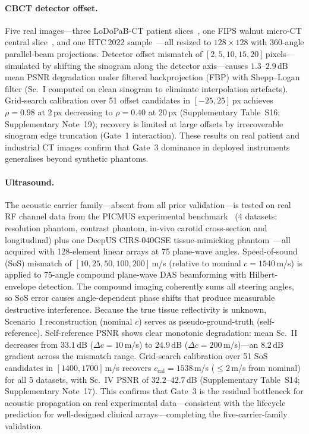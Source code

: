 \documentclass[11pt]{article}
\newcommand{\recoveryratio}{\rho}
\begin{document}
\paragraph{CBCT detector offset.}
Five real images---three LoDoPaB-CT patient slices~\cite{leuschner2021lodopab}, one FIPS walnut micro-CT central slice~\cite{hamalainen2015fips}, and one HTC\,2022 sample~\cite{meaney2022htc}---all resized to $128 \times 128$ with 360-angle parallel-beam projections. Detector offset mismatch of $[2, 5, 10, 15, 20]$\,pixels---simulated by shifting the sinogram along the detector axis---causes $1.3$--$2.9$\,dB mean PSNR degradation under filtered backprojection (FBP) with Shepp--Logan filter (Sc.~I computed on clean sinogram to eliminate interpolation artefacts). Grid-search calibration over 51 offset candidates in $[-25, 25]$\,px achieves $\recoveryratio = 0.98$ at $2$\,px decreasing to $\recoveryratio = 0.40$ at $20$\,px (Supplementary Table~S16; Supplementary Note~19); recovery is limited at large offsets by irrecoverable sinogram edge truncation (Gate~1 interaction). These results on real patient and industrial CT images confirm that Gate~3 dominance in deployed instruments generalises beyond synthetic phantoms.

\paragraph{Ultrasound.}
The acoustic carrier family---absent from all prior validation---is tested on real RF channel data from the PICMUS experimental benchmark~\cite{liebgott2016picmus} (4 datasets: resolution phantom, contrast phantom, in-vivo carotid cross-section and longitudinal) plus one DeepUS CIRS-040GSE tissue-mimicking phantom~\cite{khan2020deepus}---all acquired with 128-element linear arrays at 75 plane-wave angles. Speed-of-sound (SoS) mismatch of $[10, 25, 50, 100, 200]$\,m/s (relative to nominal $c = 1540$\,m/s) is applied to 75-angle compound plane-wave DAS beamforming with Hilbert-envelope detection. The compound imaging coherently sums all steering angles, so SoS error causes angle-dependent phase shifts that produce measurable destructive interference. Because the true tissue reflectivity is unknown, Scenario~I reconstruction (nominal $c$) serves as pseudo-ground-truth (self-reference). Self-reference PSNR shows clear monotonic degradation: mean Sc.~II decreases from $33.1$\,dB ($\Delta c{=}10$\,m/s) to $24.9$\,dB ($\Delta c{=}200$\,m/s)---an $8.2$\,dB gradient across the mismatch range. Grid-search calibration over 51 SoS candidates in $[1400, 1700]$\,m/s recovers $c_{\mathrm{cal}} = 1538$\,m/s ($\leq 2$\,m/s from nominal) for all 5 datasets, with Sc.~IV PSNR of $32.2$--$42.7$\,dB (Supplementary Table~S14; Supplementary Note~17). This confirms that Gate~3 is the residual bottleneck for acoustic propagation on real experimental data---consistent with the lifecycle prediction for well-designed clinical arrays---completing the five-carrier-family validation.
\end{document}
